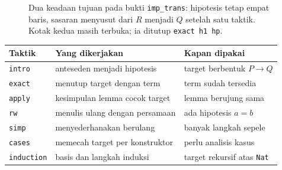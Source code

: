 \begin{figure}[htbp]
\centering
{}
\caption{Dua keadaan tujuan pada bukti \texttt{imp\_trans}: hipotesis tetap empat baris, sasaran
menyusut dari $R$ menjadi $Q$ setelah satu taktik. Kotak kedua masih terbuka; ia ditutup
\texttt{exact h1 hp}.}
\label{fig:dua-keadaan}
\end{figure}

\begin{center}
\begin{tabular}{lll}
\hline
Taktik & Yang dikerjakan & Kapan dipakai \\
\hline
\texttt{intro}     & anteseden menjadi hipotesis   & target berbentuk $P\to Q$ \\
\texttt{exact}     & menutup target dengan term    & term sudah tersedia \\
\texttt{apply}     & kesimpulan lemma cocok target & lemma berujung sama \\
\texttt{rw}        & menulis ulang dengan persamaan & ada hipotesis $a=b$ \\
\texttt{simp}      & menyederhanakan berulang      & banyak langkah sepele \\
\texttt{cases}     & memecah target per konstruktor & perlu analisis kasus \\
\texttt{induction} & basis dan langkah induksi     & target rekursif atas \texttt{Nat} \\
\hline
\end{tabular}
\end{center}

